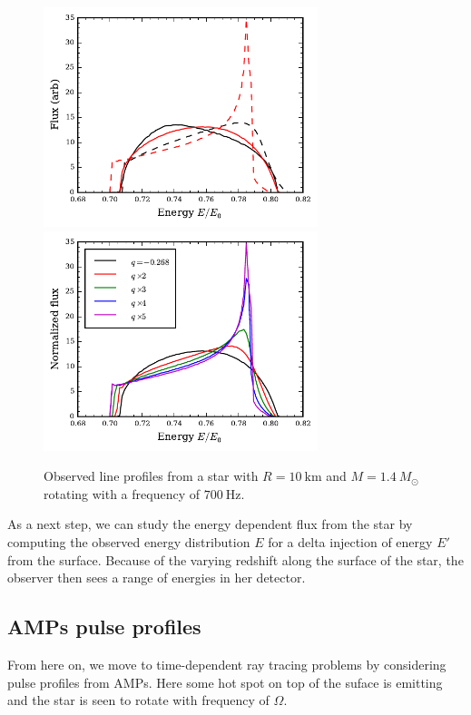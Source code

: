 \documentclass[iop, usenatbib]{emulateapj}
\newcommand{\Msun}{\ensuremath{M_{\odot}}}
\begin{document}
\begin{figure}
\includegraphics[width=8cm]{figs/fig9a.pdf}
\includegraphics[width=8cm]{figs/fig9b.pdf}
\caption{\label{fig:line_profiles}
  Observed line profiles from a star with $R=10~\mathrm{km}$ and $M=1.4~\Msun$ rotating with a frequency of $700~\mathrm{Hz}$.
  }
\end{figure}


As a next step, we can study the energy dependent flux from the star by computing the observed energy distribution $E$ for a delta injection of energy $E'$ from the surface.
Because of the varying redshift along the surface of the star, the observer then sees a range of energies in her detector.





\subsection{AMPs pulse profiles}

From here on, we move to time-dependent ray tracing problems by considering pulse profiles from AMPs.
Here some hot spot on top of the suface is emitting and the star is seen to rotate with frequency of $\Omega$.


\end{document}
